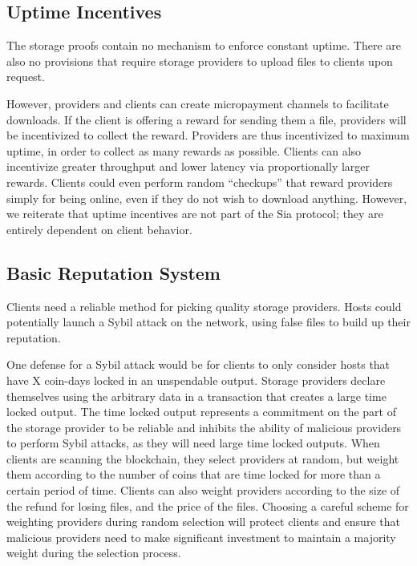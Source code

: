 \documentclass[twocolumn]{article}
\begin{document}
\subsection{Uptime Incentives}
The storage proofs contain no mechanism to enforce constant uptime.
There are also no provisions that require storage providers to upload files to clients upon request.

However, providers and clients can create micropayment channels to facilitate downloads.
If the client is offering a reward for sending them a file, providers will be incentivized to collect the reward.
Providers are thus incentivized to maximum uptime, in order to collect as many rewards as possible.
Clients can also incentivize greater throughput and lower latency via proportionally larger rewards.
Clients could even perform random ``checkups'' that reward providers simply for being online, even if they do not wish to download anything.
However, we reiterate that uptime incentives are not part of the Sia protocol; they are entirely dependent on client behavior.

\subsection{Basic Reputation System}
Clients need a reliable method for picking quality storage providers.
Hosts could potentially launch a Sybil attack on the network, using false files to build up their reputation.

One defense for a Sybil attack would be for clients to only consider hosts that have X coin-days locked in an unspendable output.
Storage providers declare themselves using the arbitrary data in a transaction that creates a large time locked output.
The time locked output represents a commitment on the part of the storage provider to be reliable and inhibits the ability of malicious providers to perform Sybil attacks, as they will need large time locked outputs.
When clients are scanning the blockchain, they select providers at random, but weight them according to the number of coins that are time locked for more than a certain period of time.
Clients can also weight providers according to the size of the refund for losing files, and the price of the files.
Choosing a careful scheme for weighting providers during random selection will protect clients and ensure that malicious providers need to make significant investment to maintain a majority weight during the selection process.
\end{document}
